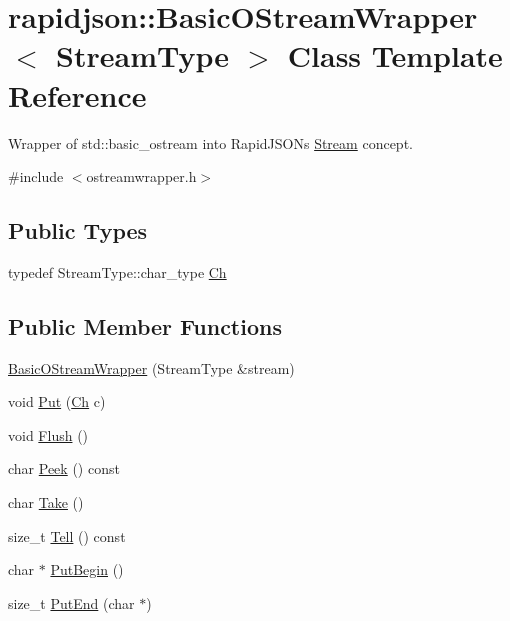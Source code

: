 \hypertarget{classrapidjson_1_1_basic_o_stream_wrapper}{}\section{rapidjson\+::Basic\+O\+Stream\+Wrapper$<$ Stream\+Type $>$ Class Template Reference}
\label{classrapidjson_1_1_basic_o_stream_wrapper}


Wrapper of {\ttfamily std\+::basic\+\_\+ostream} into Rapid\+J\+S\+ON\textquotesingle{}s \mbox{\hyperlink{classrapidjson_1_1_stream}{Stream}} concept.  




{\ttfamily \#include $<$ostreamwrapper.\+h$>$}

\subsection*{Public Types}
\begin{DoxyCompactItemize}
\item 
typedef Stream\+Type\+::char\+\_\+type \mbox{\hyperlink{classrapidjson_1_1_basic_o_stream_wrapper_a615d4f601af4c039c9087a50578226b0}{Ch}}
\end{DoxyCompactItemize}
\subsection*{Public Member Functions}
\begin{DoxyCompactItemize}
\item 
\mbox{\hyperlink{classrapidjson_1_1_basic_o_stream_wrapper_a68222d18ea4a16917b374ca53f78bbcd}{Basic\+O\+Stream\+Wrapper}} (Stream\+Type \&stream)
\item 
void \mbox{\hyperlink{classrapidjson_1_1_basic_o_stream_wrapper_ae4e99bf009dd43c7e760eebae4e732ac}{Put}} (\mbox{\hyperlink{classrapidjson_1_1_basic_o_stream_wrapper_a615d4f601af4c039c9087a50578226b0}{Ch}} c)
\item 
void \mbox{\hyperlink{classrapidjson_1_1_basic_o_stream_wrapper_a4d981433f0df0fbcaed206d11642b183}{Flush}} ()
\item 
char \mbox{\hyperlink{classrapidjson_1_1_basic_o_stream_wrapper_ac3baaf203553871fbd849368e1b5526e}{Peek}} () const
\item 
char \mbox{\hyperlink{classrapidjson_1_1_basic_o_stream_wrapper_a4ea92ceb4c1fae9cdd1912f2ab07dd73}{Take}} ()
\item 
size\+\_\+t \mbox{\hyperlink{classrapidjson_1_1_basic_o_stream_wrapper_a6bf51fa9e5692dceaf98b0cceba3f7e2}{Tell}} () const
\item 
char $\ast$ \mbox{\hyperlink{classrapidjson_1_1_basic_o_stream_wrapper_a0d9c9c5d11e53ea486cf555fb43d6fe2}{Put\+Begin}} ()
\item 
size\+\_\+t \mbox{\hyperlink{classrapidjson_1_1_basic_o_stream_wrapper_a8e1c33024d08945a32b85aeba87dca82}{Put\+End}} (char $\ast$)
\end{DoxyCompactItemize}
